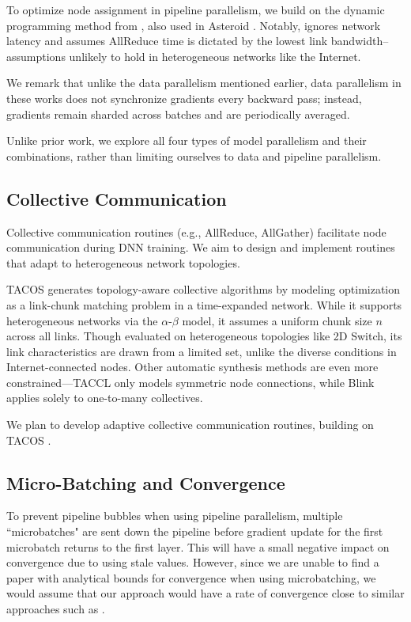 \documentclass{article}
\begin{document}
To optimize node assignment in pipeline parallelism, we build on the dynamic programming method from \cite{luo2022efficient}, also used in Asteroid \cite{ye2024asteroid}. Notably, \cite{luo2022efficient} ignores network latency and assumes AllReduce time is dictated by the lowest link bandwidth--assumptions unlikely to hold in heterogeneous networks like the Internet.

We remark that unlike the data parallelism mentioned earlier, data parallelism in these works does not synchronize gradients every backward pass; instead, gradients remain sharded across batches and are periodically averaged.

Unlike prior work, we explore all four types of model parallelism and their combinations, rather than limiting ourselves to data and pipeline parallelism.

\subsection{Collective Communication}

Collective communication routines (e.g., AllReduce, AllGather) facilitate node communication during DNN training. We aim to design and implement routines that adapt to heterogeneous network topologies.

TACOS \cite{won2024tacos} generates topology-aware collective algorithms by modeling optimization as a link-chunk matching problem in a time-expanded network. While it supports heterogeneous networks via the $\alpha$-$\beta$ model, it assumes a uniform chunk size $n$ across all links. Though evaluated on heterogeneous topologies like 2D Switch, its link characteristics are drawn from a limited set, unlike the diverse conditions in Internet-connected nodes. Other automatic synthesis methods are even more constrained—TACCL \cite{shah2023taccl} only models symmetric node connections, while Blink \cite{wang2020blink} applies solely to one-to-many collectives.

We plan to develop adaptive collective communication routines, building on TACOS \cite{won2024tacos}.

\subsection{Micro-Batching and Convergence}

To prevent pipeline bubbles when using pipeline parallelism, multiple ``microbatches" are sent down the pipeline before gradient update for the first microbatch returns to the first layer. This will have a small negative impact on convergence due to using stale values. However, since we are unable to find a paper with analytical bounds for convergence when using microbatching, we would assume that our approach would have a rate of convergence close to similar approaches such as \cite{ye2024asteroid}.
\end{document}

